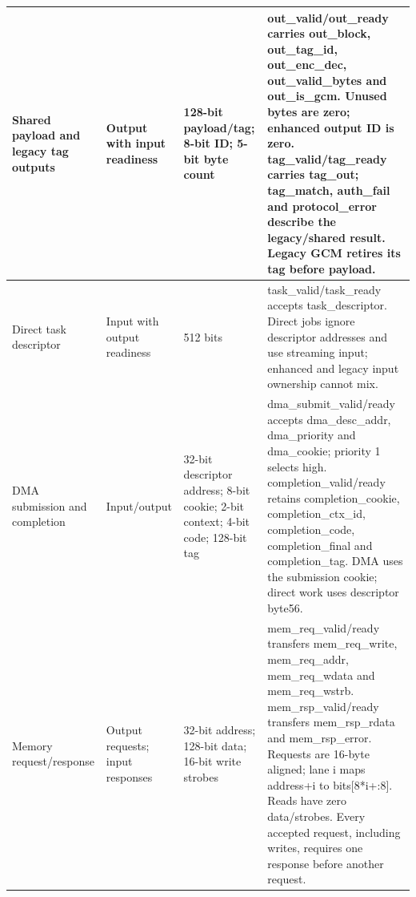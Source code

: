 \documentclass[11pt,a4paper]{article}
\begin{document}
{\begin{longtable}{@{}L{0.21\textwidth}|L{0.12\textwidth}|L{0.12\textwidth}|L{0.45\textwidth}@{}}
Shared payload and legacy tag outputs & Output with input readiness & 128-bit payload/\allowbreak{}tag; 8-bit ID; 5-bit byte count & out\_\allowbreak{}valid/\allowbreak{}out\_\allowbreak{}ready carries out\_\allowbreak{}block,\allowbreak{} out\_\allowbreak{}tag\_\allowbreak{}id,\allowbreak{} out\_\allowbreak{}enc\_\allowbreak{}dec,\allowbreak{} out\_\allowbreak{}valid\_\allowbreak{}bytes and out\_\allowbreak{}is\_\allowbreak{}gcm. Unused bytes are zero; enhanced output ID is zero. tag\_\allowbreak{}valid/\allowbreak{}tag\_\allowbreak{}ready carries tag\_\allowbreak{}out; tag\_\allowbreak{}match,\allowbreak{} auth\_\allowbreak{}fail and protocol\_\allowbreak{}error describe the legacy/\allowbreak{}shared result. Legacy GCM retires its tag before payload.\\[2pt]\hline

Direct task descriptor & Input with output readiness & 512 bits & task\_\allowbreak{}valid/\allowbreak{}task\_\allowbreak{}ready accepts task\_\allowbreak{}descriptor. Direct jobs ignore descriptor addresses and use streaming input; enhanced and legacy input ownership cannot mix.\\[2pt]\hline

DMA submission and completion & Input/\allowbreak{}output & 32-bit descriptor address; 8-bit cookie; 2-bit context; 4-bit code; 128-bit tag & dma\_\allowbreak{}submit\_\allowbreak{}valid/\allowbreak{}ready accepts dma\_\allowbreak{}desc\_\allowbreak{}addr,\allowbreak{} dma\_\allowbreak{}priority and dma\_\allowbreak{}cookie; priority 1 selects high. completion\_\allowbreak{}valid/\allowbreak{}ready retains completion\_\allowbreak{}cookie,\allowbreak{} completion\_\allowbreak{}ctx\_\allowbreak{}id,\allowbreak{} completion\_\allowbreak{}code,\allowbreak{} completion\_\allowbreak{}final and completion\_\allowbreak{}tag. DMA uses the submission cookie; direct work uses descriptor byte56.\\[2pt]\hline

Memory request/\allowbreak{}response & Output requests; input responses & 32-bit address; 128-bit data; 16-bit write strobes & mem\_\allowbreak{}req\_\allowbreak{}valid/\allowbreak{}ready transfers mem\_\allowbreak{}req\_\allowbreak{}write,\allowbreak{} mem\_\allowbreak{}req\_\allowbreak{}addr,\allowbreak{} mem\_\allowbreak{}req\_\allowbreak{}wdata and mem\_\allowbreak{}req\_\allowbreak{}wstrb. mem\_\allowbreak{}rsp\_\allowbreak{}valid/\allowbreak{}ready transfers mem\_\allowbreak{}rsp\_\allowbreak{}rdata and mem\_\allowbreak{}rsp\_\allowbreak{}error. Requests are 16-byte aligned; lane i maps address+\allowbreak{}i to bits[\allowbreak{}8*\allowbreak{}i+\allowbreak{}:8]\allowbreak{}. Reads have zero data/\allowbreak{}strobes. Every accepted request,\allowbreak{} including writes,\allowbreak{} requires one response before another request.\\[2pt]\hline


\end{longtable}}
\end{document}
